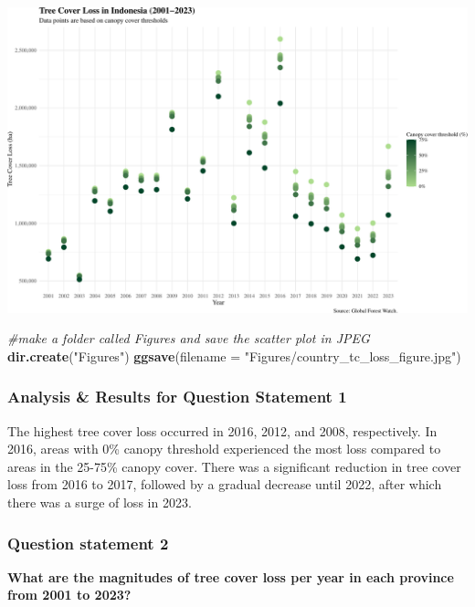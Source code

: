 \documentclass[
]{article}
\newenvironment{Shaded}{\begin{snugshade}}{\end{snugshade}}
\newcommand{\AttributeTok}[1]{\textcolor[rgb]{0.13,0.29,0.53}{#1}}
\newcommand{\CommentTok}[1]{\textcolor[rgb]{0.56,0.35,0.01}{\textit{#1}}}
\newcommand{\FunctionTok}[1]{\textcolor[rgb]{0.13,0.29,0.53}{\textbf{#1}}}
\newcommand{\NormalTok}[1]{#1}
\newcommand{\StringTok}[1]{\textcolor[rgb]{0.31,0.60,0.02}{#1}}
\begin{document}
\includegraphics{index_files/figure-latex/unnamed-chunk-3-1.pdf}

\begin{Shaded}
\begin{Highlighting}[]
\CommentTok{\#make a folder called \textquotesingle{}Figures\textquotesingle{} and save the scatter plot in JPEG}
\FunctionTok{dir.create}\NormalTok{(}\StringTok{"Figures"}\NormalTok{)}
\FunctionTok{ggsave}\NormalTok{(}\AttributeTok{filename =} \StringTok{"Figures/country\_tc\_loss\_figure.jpg"}\NormalTok{)}
\end{Highlighting}
\end{Shaded}

\subsubsection{Analysis \& Results for Question Statement
1}\label{analysis-results-for-question-statement-1}

The highest tree cover loss occurred in 2016, 2012, and 2008,
respectively. In 2016, areas with 0\% canopy threshold experienced the
most loss compared to areas in the 25-75\% canopy cover. There was a
significant reduction in tree cover loss from 2016 to 2017, followed by
a gradual decrease until 2022, after which there was a surge of loss in
2023.

\subsubsection{Question statement 2}\label{question-statement-2}

\textbf{What are the magnitudes of tree cover loss per year in each
province from 2001 to 2023?}
\end{document}
